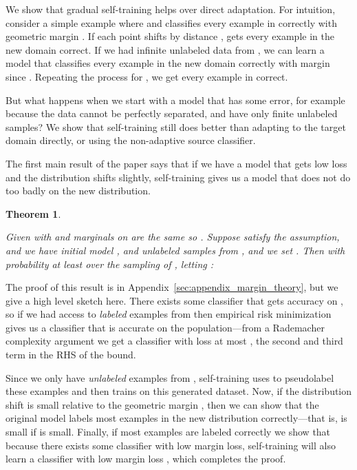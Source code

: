 \documentclass[11pt]{article}
\newtheorem{theorem}{Theorem}[section]
\begin{document}
We show that gradual self-training helps over direct adaptation.
For intuition, consider a simple example where  and  classifies every example in  correctly with geometric margin .
If each point shifts by distance ,  gets every example in the new domain  correct.
If we had infinite unlabeled data from , we can learn a model  that classifies every example in the new domain  correctly with margin  since .
Repeating the process for , we get every example in  correct.

But what happens when we start with a model that has some error, for example because the data cannot be perfectly separated, and have only finite unlabeled samples?
We show that self-training still does better than adapting to the target domain directly, or using the non-adaptive source classifier.

The first main result of the paper says that if we have a model  that gets low loss and the distribution shifts slightly, self-training gives us a model  that does not do too badly on the new distribution.

\newcommand{\gradualSelfTrainTheoremText}{
Given  with  and marginals on  are the same so . Suppose  satisfy the \boundedAssump{} assumption, and we have initial model , and  unlabeled samples  from , and we set . Then with probability at least  over the sampling of , letting :

}

\begin{theorem}
\label{thm:gradualSelfTrain}
\gradualSelfTrainTheoremText{}
\end{theorem}

The proof of this result is in Appendix~\ref{sec:appendix_margin_theory}, but we give a high level sketch here. There exists some classifier that gets accuracy  on , so if we had access to  \emph{labeled} examples from  then empirical risk minimization gives us a classifier that is accurate on the population---from a Rademacher complexity argument we get a classifier  with loss at most , the second and third term in the RHS of the bound.

Since we only have \emph{unlabeled} examples from , self-training uses  to pseudolabel these  examples and then trains on this generated dataset. Now, if the distribution shift  is small relative to the geometric margin , then we can show that the original model  labels most examples in the new distribution  correctly---that is,  is small if  is small. Finally, if most examples are labeled correctly we show that because there exists some classifier  with low margin loss, self-training will also learn a classifier  with low margin loss , which completes the proof.
\end{document}
